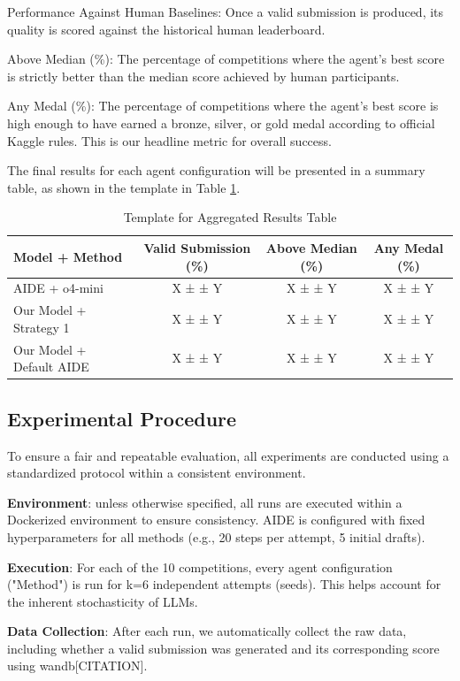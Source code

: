 Performance Against Human Baselines: Once a valid submission is produced, its quality is scored against the historical human leaderboard.

Above Median (\%): The percentage of competitions where the agent's best score is strictly better than the median score achieved by human participants.

Any Medal (\%): The percentage of competitions where the agent's best score is high enough to have earned a bronze, silver, or gold medal according to official Kaggle rules. This is our headline metric for overall success.

The final results for each agent configuration will be presented in a summary table, as shown in the template in Table \ref{results_template}.

\begin{table}[htbp]
\centering
\caption{Template for Aggregated Results Table}
\label{results_template}
\begin{tabular}{lccc}
\hline
\textbf{Model + Method} & \textbf{Valid Submission (\%)} & \textbf{Above Median (\%)} & \textbf{Any Medal (\%)} \\ \hline
AIDE + o4-mini & X%
±
±
 Y & X%
±
±
 Y & X%
±
±
 Y \\
Our Model + Strategy 1 & X%
±
±
 Y & X%
±
±
 Y & X%
±
±
 Y \\
Our Model + Default AIDE & X%
±
±
 Y & X%
±
±
 Y & X%
±   
±
 Y \\ \hline
\end{tabular}
\end{table}


\subsection{Experimental Procedure}

To ensure a fair and repeatable evaluation, all experiments are conducted using a standardized protocol within a consistent environment.

\textbf{Environment}: unless otherwise specified, all runs are executed within a Dockerized environment to ensure consistency. AIDE is configured with fixed hyperparameters for all methods (e.g., 20 steps per attempt, 5 initial drafts).

\textbf{Execution}: For each of the 10 competitions, every agent configuration ("Method") is run for k=6 independent attempts (seeds). This helps account for the inherent stochasticity of LLMs.

\textbf{Data Collection}: After each run, we automatically collect the raw data, including whether a valid submission was generated and its corresponding score using wandb[CITATION].

